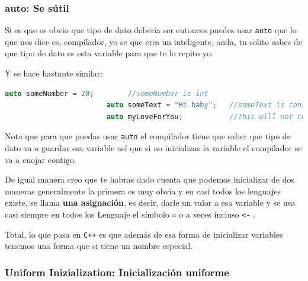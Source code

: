 \documentclass[12pt, fleqn]{report}                             %
\theoremstyle{break}                                            %
\newcommand{\textCode}[1]  { \texttt{#1} }                      %
\newcommand \Cpp  {\textCode{C++} }                               %
\begin{document}
                \subsubsection{auto: Se sútil}

                    Si es que es obvio que tipo de dato debería ser entonces puedes usar \textCode{auto}
                    que lo que nos dice es, compilador, yo se que eres un inteligente, anda, 
                    tu solito sabes de que tipo de dato es esta variable para que te lo repito yo.
                    
                    Y se hace hastante similar:
                    \begin{lstlisting}[language=C++, gobble=24]
                        auto someNumber = 20;        //someNumber is int
                        auto someText = "Hi baby";   //someText is const char* (this is sad)
                        auto myLoveForYou;           //This will not compile :v
                    \end{lstlisting}

                    Nota que para que puedas usar \textCode{auto} el compilador tiene que saber que tipo
                    de dato va a guardar esa variable así que si no inicializas la variable 
                    el compilador se va a enojar contigo.

                    De igual manera creo que te habras dado cuenta que podemos inicializar de dos maneras
                    generalmente la primera es muy obvia y en casi todos los lenguajes existe, se llama
                    \textbf{una asignación}, es decir, darle un valor a esa variable y se usa casi siempre en
                    todos los Lenguaje el símbolo \textCode{=} o a veces incluso \textCode{<-}.

                    Total, lo que pasa en \Cpp es que además de esa forma de inicializar variables tenemos
                    una forma que si tiene un nombre especial.

                \subsubsection{Uniform Inizialization: Inicialización uniforme}
\end{document}
